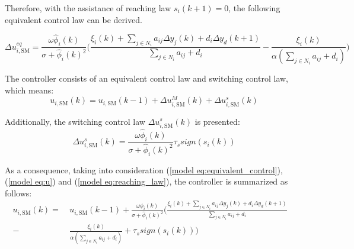 \documentclass[journal,onecolumn]{IEEEtran}
\begin{document}



Therefore, with the assistance of reaching law $ s_i(k+1) = 0 $, the following equivalent control law can be derived.

\begin{equation}
    \label{model eq:equivalent_control}
    \Delta u_{i,\text{SM}}^{eq} = \frac{\omega \hat{\phi}_i(k)}{\sigma + \hat{\phi}_i(k)^2}\bigg(\frac{\xi_i(k)+ \sum_{j \in N_i}a_{ij} \Delta y_j(k) + d_i \Delta y_d(k+1)}{\displaystyle \sum_{j \in N_i}a_{ij}+d_i} - \frac{\xi_i(k)}{\alpha(\displaystyle \sum_{j \in N_i}a_{ij}+d_i)} 
    \bigg)
\end{equation}

The controller consists of an equivalent control law and switching control law, which means:
\begin{equation}
    \label{model eq:u}
    u_{i,\text{SM}}(k) = u_{i,\text{SM}}(k-1) + \Delta u_{i,\text{SM}}^M(k)+ \Delta u_{i,\text{SM}}^s(k)
\end{equation}

Additionally, the switching control law $ \Delta u_{i,\text{SM}}^s(k) $ is presented:
\begin{equation}
    \label{model eq:reaching_law}
    \Delta u_{i,\text{SM}}^s(k) = \frac{\omega \hat{\phi}_i(k)}{\sigma + \hat{\phi}_i(k)^2}\tau_s sign(s_i(k))
\end{equation}

As a consequence, taking into consideration (\ref{model eq:equivalent_control}), (\ref{model eq:u}) and (\ref{model eq:reaching_law}), the controller is summarized as follows:
\begin{align}
    \label{model eq:sm_controller}
    u_{i,\text{SM}}(k) =\ & u_{i,\text{SM}}(k-1) +  \frac{\omega \hat{\phi}_i(k)}{\sigma + \hat{\phi}_i(k)^2} \bigg( \frac{\xi_i(k)+ \sum_{j \in N_i}a_{ij} \Delta y_j(k) + d_i \Delta y_d(k+1)}{\sum_{j \in N_i}a_{ij}+d_i} \quad \nonumber  \\
    - \ & \frac{\xi_i(k)}{\alpha(\displaystyle \sum_{j \in N_i}a_{ij}+d_i)} + \tau_s sign(s_i(k)) \bigg)
\end{align}
    
\end{document}
